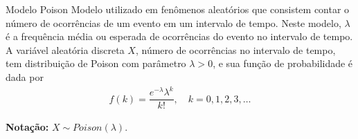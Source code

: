\documentclass[9pt]{beamer}
\begin{document}
% 
% 
% 
% 
% 
% 
% 

\begin{frame}{Modelo Poison}
Modelo utilizado em fenômenos aleatórios que consistem contar o número de ocorrências de um evento em um intervalo de tempo. Neste modelo, $\lambda$ é a frequência média ou esperada de ocorrências do evento no  intervalo de tempo. A variável aleatória discreta $X$, número de ocorrências no intervalo de tempo, tem distribuição de Poison com parâmetro $\lambda > 0$, e sua função de probabilidade é dada por
\begin{align*}
f(k) = \dfrac{e^{-\lambda}\lambda^k}{k!}, \quad k =0,1,2,3, \dots
\end{align*}
\vfill

\textbf{Notação:} $X \sim Poison(\lambda)$.
\end{frame}
\end{document}
